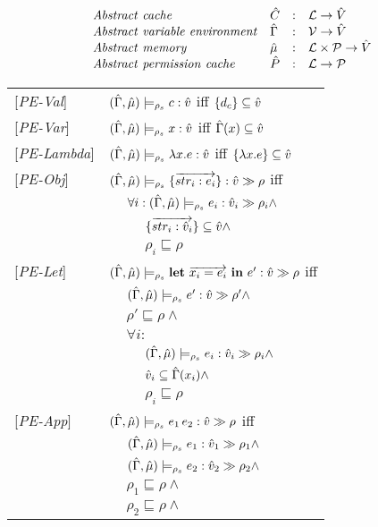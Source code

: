 \documentclass[[12pt,a4paper,twoside,openrigh]{report}
\begin{document}
\[
\begin{array}{llcl}
\mathit{Abstract\ cache} & \hat{C} & : & {\mathcal L} \rightarrow \hat{V} \\
\mathit{Abstract\ variable\ environment} & \hat{\Gamma} & : & \mathcal{V} \rightarrow \hat{V} \\
\mathit{Abstract\ memory} & \hat{\mu} & : & {\mathcal L} \times \mathcal{P} \rightarrow \hat{V} \\
\mathit{Abstract\ permission\ cache} & \hat{P} & : & {\mathcal L} \rightarrow \mathcal{P} \\
\end{array}
\]
\begin{tabular}{l l l l}
{[\textit{PE-Val}]}&\multicolumn{3}{l}{$(\hat{\Gamma},\hat{\mu}) \models_{\rho_s} c : \hat{v}$ iff $\{d_c\} \subseteq \hat{v}$} \\
{[\textit{PE-Var}]}&\multicolumn{3}{l}{$(\hat{\Gamma},\hat{\mu}) \models_{\rho_s} x : \hat{v}$ iff $\hat{\Gamma}(x) \subseteq \hat{v}$} \\ 
{[\textit{PE-Lambda}]}&\multicolumn{3}{l}{$(\hat{\Gamma},\hat{\mu}) \models_{\rho_s} \lambda x.e : \hat{v}$ iff $\{\lambda x.e\} \subseteq \hat{v}$} \\
{[\textit{PE-Obj}]}&\multicolumn{3}{l}{$(\hat{\Gamma},\hat{\mu}) \models_{\rho_s} \{\overrightarrow{str_i : e_i}\} : \hat{v} \gg \rho$ iff} \\
&&\multicolumn{2}{l}{$\forall i: (\hat{\Gamma},\hat{\mu}) \models_{\rho_s} e_i : \hat{v}_{i} \gg \rho_{i} \wedge$}\\
&&&$\{\overrightarrow{str_i :\hat{v}_i}\} \subseteq \hat{v} \wedge$ \\
&&&$\rho_i \sqsubseteq \rho$ \\ 
{[\textit{PE-Let}]}&\multicolumn{3}{l}{$(\hat{\Gamma},\hat{\mu}) \models_{\rho_s} \mathbf{let}\ \overrightarrow{x_i = e_i}\ \mathbf{in}\ e' : \hat{v} \gg \rho$ iff}\\
&&\multicolumn{2}{l}{$(\hat{\Gamma},\hat{\mu}) \models_{\rho_s} e' : \hat{v} \gg \rho' \wedge$} \\
&&\multicolumn{2}{l}{$\rho' \sqsubseteq \rho \wedge$} \\
&&\multicolumn{2}{l}{$ \forall i:$}\\
&&& $(\hat{\Gamma},\hat{\mu}) \models_{\rho_s} e_i : \hat{v}_{i} \gg \rho_{i} \wedge$ \\
&&& $\hat{v}_i \subseteq \hat{\Gamma}(x_i) \wedge$ \\
&&& $\rho_i \sqsubseteq \rho$ \\
{[\textit{PE-App}]}&\multicolumn{3}{l}{$(\hat{\Gamma},\hat{\mu}) \models_{\rho_s} e_1\, e_2 : \hat{v} \gg \rho$ iff} \\
&&\multicolumn{2}{l}{$(\hat{\Gamma},\hat{\mu}) \models_{\rho_s} e_1 : \hat{v}_{1} \gg \rho_{1} \wedge$} \\
&&\multicolumn{2}{l}{$(\hat{\Gamma},\hat{\mu}) \models_{\rho_s} e_2 : \hat{v}_{2} \gg \rho_{2} \wedge$} \\
&&\multicolumn{2}{l}{$\rho_1 \sqsubseteq \rho \wedge$} \\
&&\multicolumn{2}{l}{$\rho_2 \sqsubseteq \rho \wedge$} \\

\end{tabular}
\end{document}

